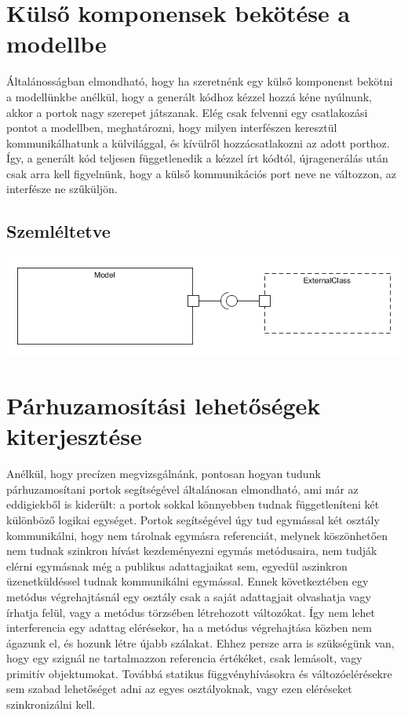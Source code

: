 \documentclass[a4paper,12pt]{report}
\begin{document}
\section{Külső komponensek bekötése a modellbe}
Általánosságban elmondható, hogy ha szeretnénk egy külső komponenst bekötni a modellünkbe anélkül, hogy a generált kódhoz kézzel hozzá kéne nyúlnunk, akkor a portok nagy szerepet játszanak. Elég csak felvenni egy csatlakozási pontot a modellben, meghatározni, hogy milyen interfészen keresztül kommunikálhatunk a külvilággal, és kívülről hozzácsatlakozni az adott porthoz. Így, a generált kód teljesen függetlenedik a kézzel írt kódtól, újragenerálás után csak arra kell figyelnünk, hogy a külső kommunikációs port neve ne változzon, az interfésze ne szűküljön. \\

\subsection{Szemléltetve}
\includegraphics[scale=0.6]{external_with_ports.png} \\


\section{Párhuzamosítási lehetőségek kiterjesztése}
Anélkül, hogy precízen megvizsgálnánk, pontosan hogyan tudunk párhuzamosítani portok segítségével általánosan elmondható, ami már az eddigiekből is kiderült: a portok sokkal könnyebben tudnak függetleníteni két különböző logikai egységet. Portok segítségével úgy tud egymással két osztály kommunikálni, hogy nem tárolnak egymásra referenciát, melynek köszönhetően nem tudnak szinkron hívást kezdeményezni egymás metódusaira, nem tudják elérni egymásnak még a publikus adattagjaikat sem, egyedül aszinkron üzenetküldéssel tudnak kommunikálni egymással. Ennek következtében egy metódus végrehajtásnál egy osztály csak a saját adattagjait olvashatja vagy írhatja felül, vagy a metódus törzsében létrehozott változókat. Így nem lehet interferencia egy adattag elérésekor, ha a metódus végrehajtása közben nem ágazunk el, és hozunk létre újabb szálakat. Ehhez persze arra is szükségünk van, hogy egy szignál ne tartalmazzon referencia értékéket, csak lemásolt, vagy primitív objektumokat. Továbbá statikus függvényhívásokra és változóelérésekre sem szabad lehetőséget adni az egyes osztályoknak, vagy ezen eléréseket szinkronizálni kell. \\
\end{document}
